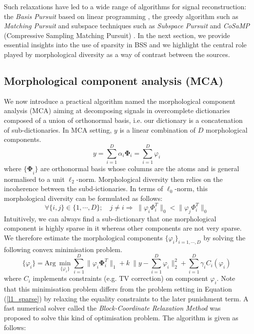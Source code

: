 Such relaxations have led to a wide range of algorithms for signal reconstruction: the \textit{Basis Pursuit} based on linear programming  \cite{BPAtomicDcomp}, the greedy algorithm such as \textit{Matching Pursuit} \cite{Mallat_Zhang1993} and subspace techniques such as \textit{Subspace Pursuit} \cite{WdaiSP} and \textit{CoSaMP} (Compressive
Sampling Matching Pursuit) \cite{CoSaMP2008}. In the next section, we provide essential insights into the use of sparsity in BSS and we highlight the central role played by morphological diversity as a way of contrast between the sources.


\subsection{Morphological component analysis (MCA)}
We now introduce a practical algorithm named the morphological component analysis (MCA) aiming at decomposing signals in overcomplete dictionaries composed of a union of orthonormal basis, i.e. our dictionary is a concatenation of sub-dictionaries. In MCA setting, $y$ is a linear combination of $D$ morphological components. 
\begin{equation}
    y = \sum_{i=1}^D  \alpha_i \mathbf{\Phi}_i = \sum_{i=1}^D \varphi_i
    \label{Eq_dictionary}
\end{equation}
where $\mathbf{\{\Phi}_i\}$ are orthonormal basis whose columns are the atoms and is general normalised to a unit $\ell_2$-norm. Morphological diversity then relies on the incoherence between the subd-ictionaries. In terms of $\ell_0$-norm, this morphological diversity can be formulated as follows:
\begin{equation}
    \forall\{i,j\} \in \{1,\cdots,D\};\quad j \neq i \Rightarrow \; \lVert \varphi_i \Phi_i^T \rVert_0 < \lVert \varphi_j \Phi_i^T \rVert_0
\end{equation}
Intuitively, we can always find a sub-dictionary that one morphological component is highly sparse in it whereas other components are not very sparse. We therefore estimate the morphological components $\{\varphi_i\}_{i=1,\cdots,D}$ by solving the following convex minimisation problem.
\begin{equation}
    \{\varphi_i\} = \text{Arg} \: \min_{\{\varphi_i\}}\sum_{i=1}^D \lVert\varphi_i \mathbf{\Phi}_i^T \rVert_{1} + k \:\lVert y-\sum_{i=1}^D\varphi_i \rVert^2_2 +  \sum_{i=1}^D \gamma_i C_i (\varphi_i)
    \label{MCAequation}
\end{equation}
where $C_i$ implements constraints (e.g. TV correction) on component $\varphi_i$. Note that this minimisation problem differs from the problem setting in Equation (\ref{l1_sparse}) by relaxing the equality constraints to the later punishment term. A fast numerical solver called the \textit{Block-Coordinate Relaxation Method} \cite{BlockCoordinateMethod} was proposed to solve this kind of optimisation problem. 
The algorithm is given as follows:

